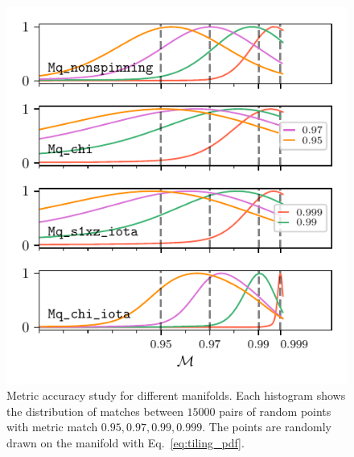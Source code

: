 \documentclass[twocolumn,showpacs,preprintnumbers,nofootinbib,prd,
superscriptaddress,10pt]{revtex4-2}
\begin{document}
\begin{figure}[t]
	\centering
	\includegraphics{metric_accuracy_hessian}
	\caption{Metric accuracy study for different manifolds.
	Each histogram shows the distribution of matches between $15000$ pairs of random points with metric match $0.95, 0.97, 0.99, 0.999$. The points are randomly drawn on the manifold with Eq.~\eqref{eq:tiling_pdf}.}
	\label{fig:metric_accuracy}
\end{figure}
\end{document}
